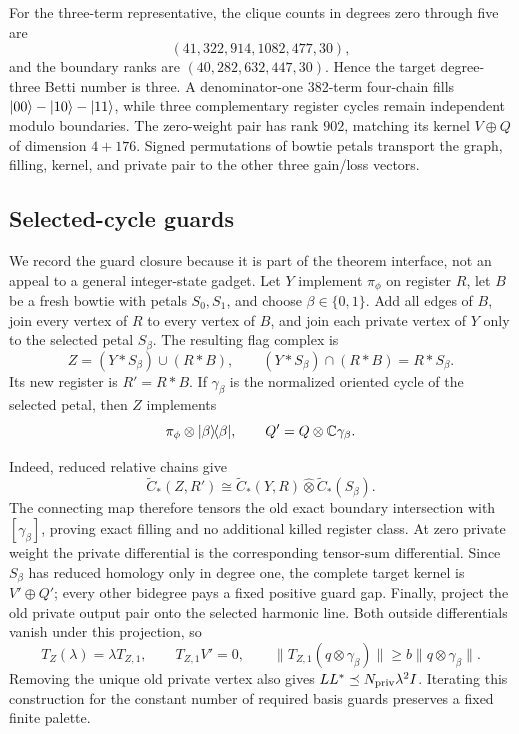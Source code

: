 For the three-term representative, the clique counts in degrees zero through
five are
\[
(41,322,914,1082,477,30),
\]
and the boundary ranks are \((40,282,632,447,30)\).  Hence the target
degree-three Betti number is three.  A denominator-one 382-term four-chain
fills \(\lvert 00\rangle-\lvert 10\rangle-\lvert 11\rangle\), while three complementary register
cycles remain independent modulo boundaries.  The zero-weight pair has rank
\(902\), matching its kernel \(V\oplus Q\) of dimension \(4+176\).
Signed permutations of bowtie petals transport the graph, filling, kernel,
and private pair to the other three gain/loss vectors.

\subsection{Selected-cycle guards}

We record the guard closure because it is part of the theorem interface, not
an appeal to a general integer-state gadget.  Let \(Y\) implement
\(\pi_\phi\) on register \(R\), let \(B\) be a fresh bowtie with petals
\(S_0,S_1\), and choose \(\beta\in\{0,1\}\).  Add all edges of \(B\), join
every vertex of \(R\) to every vertex of \(B\), and join each private vertex
of \(Y\) only to the selected petal \(S_\beta\).  The resulting flag complex
is
\begin{equation}
\label{eq:guard-union}
Z=(Y*S_\beta)\cup(R*B),\qquad
(Y*S_\beta)\cap(R*B)=R*S_\beta .
\end{equation}
Its new register is \(R'=R*B\).  If \(\gamma_\beta\) is the normalized
oriented cycle of the selected petal, then \(Z\) implements
\[
\pi_\phi\otimes\lvert \beta\rangle\!\langle \beta\rvert,\qquad
Q'=Q\otimes\mathbb C\gamma_\beta .
\]

Indeed, reduced relative chains give
\[
\widetilde C_*(Z,R')
\cong\widetilde C_*(Y,R)\widehat\otimes
\widetilde C_*(S_\beta).
\]
The connecting map therefore tensors the old exact boundary intersection
with \([\gamma_\beta]\), proving exact filling and no additional killed
register class.  At zero private weight the private differential is the
corresponding tensor-sum differential.  Since \(S_\beta\) has reduced
homology only in degree one, the complete target kernel is
\(V'\oplus Q'\); every other bidegree pays a fixed positive guard gap.
Finally, project the old private output pair onto the selected harmonic line.
Both outside differentials vanish under this projection, so
\[
T_Z(\lambda)=\lambda T_{Z,1},\qquad
T_{Z,1}V'=0,\qquad
\|T_{Z,1}(q\otimes\gamma_\beta)\|
\ge b\|q\otimes\gamma_\beta\|.
\]
Removing the unique old private vertex also gives
\(LL^*\preceq N_{\rm priv}\lambda^2I\).  Iterating this construction for the
constant number of required basis guards preserves a fixed finite palette.

